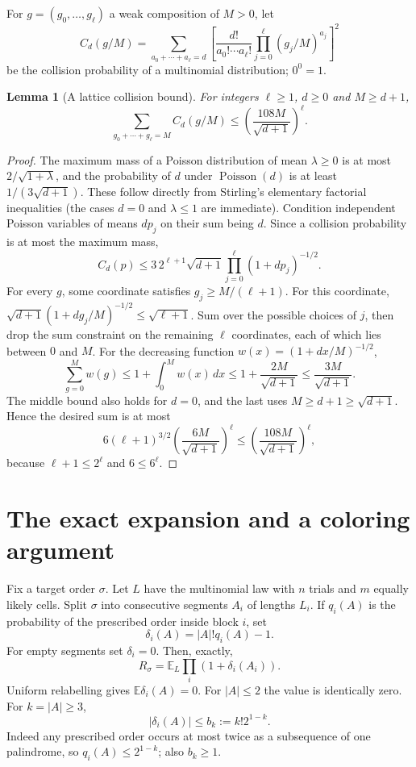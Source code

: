 \documentclass[11pt]{article}
\newtheorem{lemma}[theorem]{Lemma}
\newcommand{\E}{\mathbb E}
\begin{document}
For $g=(g_0,\ldots,g_\ell)$ a weak composition of $M>0$, let
\[
 C_d(g/M)=\sum_{a_0+\cdots+a_\ell=d}
 \left[\frac{d!}{a_0!\cdots a_\ell!}
       \prod_{j=0}^\ell(g_j/M)^{a_j}\right]^2
\]
be the collision probability of a multinomial distribution; $0^0=1$.
\begin{lemma}[A lattice collision bound]\label{lem:lattice}
For integers $\ell\geq1$, $d\geq0$ and $M\geq d+1$,
\[
 \sum_{g_0+\cdots+g_\ell=M}C_d(g/M)
 \leq\left(\frac{108M}{\sqrt{d+1}}\right)^\ell.
\]
\end{lemma}
\begin{proof}
The maximum mass of a Poisson distribution of mean $\lambda\geq0$ is
at most $2/\sqrt{1+\lambda}$, and the probability of $d$ under
$\operatorname{Poisson}(d)$ is at least $1/(3\sqrt{d+1})$.
These follow directly from Stirling's elementary factorial inequalities
(the cases $d=0$ and $\lambda\leq1$ are immediate).
Condition independent Poisson variables of means $dp_j$ on their sum
being $d$. Since a collision probability is at most the maximum mass,
\[
 C_d(p)\leq3\,2^{\ell+1}\sqrt{d+1}
              \prod_{j=0}^\ell(1+dp_j)^{-1/2}.
\]
For every $g$, some coordinate satisfies $g_j\geq M/(\ell+1)$.
For this coordinate,
$\sqrt{d+1}(1+dg_j/M)^{-1/2}\leq\sqrt{\ell+1}$.
Sum over the possible choices of $j$, then drop the sum constraint on the
remaining $\ell$ coordinates, each of which lies between $0$ and $M$.
For the decreasing function $w(x)=(1+dx/M)^{-1/2}$,
\[
 \sum_{g=0}^M w(g)\leq 1+\int_0^M w(x)\,dx
 \leq 1+\frac{2M}{\sqrt{d+1}}
 \leq\frac{3M}{\sqrt{d+1}}.
\]
The middle bound also holds for $d=0$, and the last uses
$M\geq d+1\geq\sqrt{d+1}$. Hence the desired sum is at most
\[
 6(\ell+1)^{3/2}
     \left(\frac{6M}{\sqrt{d+1}}\right)^\ell
 \leq\left(\frac{108M}{\sqrt{d+1}}\right)^\ell,
\]
because $\ell+1\leq2^\ell$ and $6\leq6^\ell$.
\end{proof}

\section{The exact expansion and a coloring argument}
Fix a target order $\sigma$. Let $L$ have the multinomial law with $n$ trials
and $m$ equally likely cells. Split $\sigma$ into consecutive segments $A_i$
of lengths $L_i$. If $q_i(A)$ is the probability of the prescribed order
inside block $i$, set
\[
 \delta_i(A)=|A|!q_i(A)-1.
\]
For empty segments set $\delta_i=0$. Then, exactly,
\[
 R_\sigma=\E_L\prod_i(1+\delta_i(A_i)).
\]
Uniform relabelling gives $\E\delta_i(A)=0$. For $|A|\leq2$ the value is
identically zero. For $k=|A|\geq3$,
\[
 |\delta_i(A)|\leq b_k:=k!2^{1-k}.
\]
Indeed any prescribed order occurs at most twice as a subsequence of one
palindrome, so $q_i(A)\leq2^{1-k}$; also $b_k\geq1$.
\end{document}
